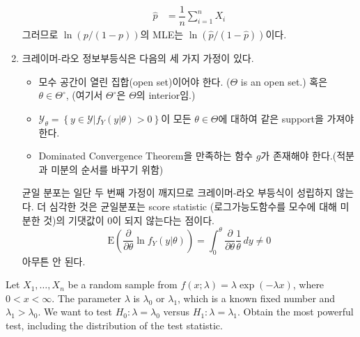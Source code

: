 \documentclass[answers]{exam}
\begin{document}
\begin{questions}
\begin{solution}
\begin{enumerate}
\begin{align}
        \hat{p}&= \dfrac{1}{n}\sum_{i=1}^{n}X_{i}
      \end{align}
      그러므로 $\ln\left(p/\left(1-p\right)\right)$의 MLE는 $\ln\left(\hat{p}/\left(1-\hat{p}\right)\right)$이다.
      \item 크레이머-라오 정보부등식은 다음의 세 가지 가정이 있다.
      \begin{itemize}
        \item 모수 공간이 열린 집합(open set)이어야 한다. ($\Theta$ is an open set.) 혹은 $\theta \in \Theta^{\circ}$, (여기서 $\Theta^{\circ}$은 $\Theta$의 interior임.)
        \item $\mathcal{Y}_{\theta}=\left\{y\in\mathcal{Y}|f_{Y}\left(y|\theta\right)>0 \right\}$이 모든 $\theta\in \Theta$에 대하여 같은 support을 가져야 한다.
        \item Dominated Convergence Theorem을 만족하는 함수 $g$가 존재해야 한다.(적분과 미분의 순서를 바꾸기 위함)
      \end{itemize}
      균일 분포는 일단 두 번째 가정이 깨지므로 크레이머-라오 부등식이 성립하지 않는다. 더 심각한 것은 균일분포는 score statistic (로그가능도함수를 모수에 대해 미분한 것)의 기댓값이 0이 되지 않는다는 점이다.
      $$
        \mathrm{E}\left(\dfrac{\partial}{\partial\theta}\ln f_{Y}\left(y|\theta\right)\right) = \int_{0}^{\theta}\dfrac{\partial}{\partial\theta}\dfrac{1}{\theta}\,dy \neq 0
      $$
      아무튼 안 된다.
    \end{enumerate}
   \end{solution}
   \question
   Let $X_{1},\ldots,X_{n}$ be a random sample from $f\left(x;\lambda\right)=\lambda\exp\left(-\lambda x\right)$, where $0<x<\infty$. The parameter $\lambda$ is $\lambda_{0}$ or $\lambda_{1}$, which is a known fixed number and $\lambda_{1}>\lambda_{0}$. We want to test $H_{0}:\lambda=\lambda_{0}$ versus $H_{1}:\lambda=\lambda_{1}$. Obtain the most powerful test, including the distribution of the test statistic.
   \begin{solution}
    

\end{solution}
\end{questions}
\end{document}
